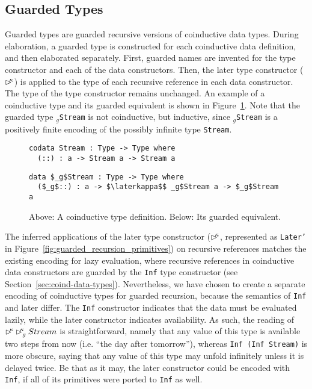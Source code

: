 
\subsection{Guarded Types}
\label{sec:guarded-types}
Guarded types are guarded recursive versions of coinductive data types. During
elaboration, a guarded type is constructed for each coinductive data definition,
and then elaborated separately. First, guarded names are invented for the type constructor and
each of the data constructors. Then, the later type constructor ($\rhd^{\!\!\kappa}$)
is applied to the type of each recursive reference in each data
constructor. The type of the type constructor remains unchanged. An example of a
coinductive type and its guarded equivalent is shown in
Figure~\ref{fig:guarded_stream_inf}. Note that the guarded type \texttt{$_g$Stream} is not coinductive, but
inductive, since \texttt{$_g$Stream} is a positively finite encoding of the
possibly infinite type \texttt{Stream}.

\begin{figure}[h]
\begin{lstlisting}[mathescape,title=\idrisBlock]
codata Stream : Type -> Type where
  (::) : a -> Stream a -> Stream a
\end{lstlisting}
\begin{lstlisting}[mathescape,title=\idrisBlock]
data $_g$Stream : Type -> Type where
  ($_g$::) : a -> $\laterkappa$$ _g$Stream a -> $_g$Stream a
\end{lstlisting}
  \caption{Above: A coinductive type definition. Below: Its guarded equivalent.}
  \label{fig:guarded_stream_inf}
\end{figure}

The inferred applications of the later type constructor ($\rhd^{\!\!\kappa}$, represented
as \texttt{Later'} in Figure~\ref{fig:guarded_recursion_primitives}) on
recursive references matches the existing encoding for lazy evaluation, where
recursive references in coinductive data constructors are guarded by the
\texttt{Inf} type constructor (see
Section~\ref{sec:coind-data-types}). Nevertheless, we have chosen to create a
separate encoding of coinductive types for guarded recursion, because the
semantics of \texttt{Inf} and later differ. The \texttt{Inf} constructor
indicates that the data must be evaluated lazily, while the later constructor
indicates availability. As such, the reading of
$\rhd^{\!\!\kappa}\rhd^{\!\!\kappa} _{g}Stream$ is straightforward, namely that any value of
this type is available two steps from now (i.e. ``the day after tomorrow''),
whereas \texttt{Inf (Inf Stream)} is more obscure, saying that any value of this
type may unfold infinitely unless it is delayed twice. Be that as it may, the
later constructor could be encoded with \texttt{Inf}, if all of its primitives
were ported to \texttt{Inf} as well.

